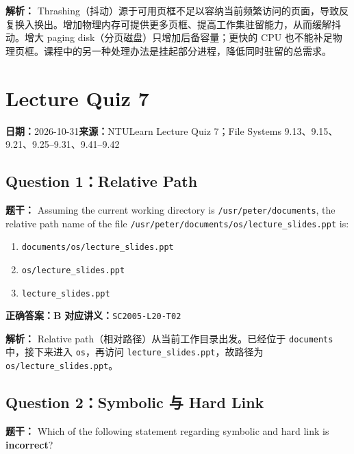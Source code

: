 \documentclass[11pt,a4paper,fontset=fandol]{ctexart}
\renewcommand{\exercisequestion}[2]{%
  \Needspace{5\baselineskip}%
  \subsection{#2}\label{exercise:#1}%
}
\renewcommand{\exercisemeta}[5]{%
  {\small\textbf{日期：}#2\quad\textbf{来源：}#3\par}%
}
\renewenvironment{checkedsolution}
  {\par\nopagebreak[4]\textbf{解析：}\ignorespaces}
  {\par}
\begin{document}
\begin{checkedsolution}
Thrashing（抖动）源于可用页框不足以容纳当前频繁访问的页面，导致反复换入换出。增加物理内存可提供更多页框、提高工作集驻留能力，从而缓解抖动。增大 paging disk（分页磁盘）只增加后备容量；更快的 CPU 也不能补足物理页框。课程中的另一种处理办法是挂起部分进程，降低同时驻留的总需求。
\end{checkedsolution}

\section{Lecture Quiz 7}
\label{homework:SC2005-HW07}

\exercisemeta
  {SC2005-HW07}
  {2026-10-31}
  {NTULearn Lecture Quiz 7；File Systems 9.13、9.15、9.21、9.25--9.31、9.41--9.42}
  {五道题已完成，并根据讲义与平台反馈核对}
  {是（2026-10-31）}

\exercisequestion{SC2005-HW07-Q01}{Question 1：Relative Path}

\textbf{题干：} Assuming the current working directory is \texttt{/usr/peter/documents}, the relative path name of the file \texttt{/usr/peter/documents/os/lecture\_slides.ppt} is:

\begin{enumerate}[label=\Alph*.,leftmargin=2.4em]
  \item \texttt{documents/os/lecture\_slides.ppt}
  \item \texttt{os/lecture\_slides.ppt}
  \item \texttt{lecture\_slides.ppt}
\end{enumerate}

\textbf{正确答案：B}\qquad
\textbf{对应讲义：}\texttt{SC2005-L20-T02}

\begin{checkedsolution}
Relative path（相对路径）从当前工作目录出发。已经位于 \texttt{documents} 中，接下来进入 \texttt{os}，再访问 \texttt{lecture\_slides.ppt}，故路径为 \texttt{os/lecture\_slides.ppt}。
\end{checkedsolution}

\exercisequestion{SC2005-HW07-Q02}{Question 2：Symbolic 与 Hard Link}

\textbf{题干：} Which of the following statement regarding symbolic and hard link is \textbf{incorrect}?
\end{document}
